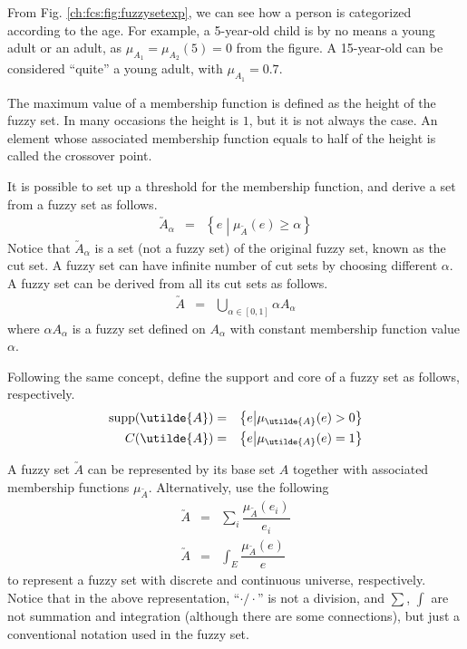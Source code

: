 From Fig. \ref{ch:fcs:fig:fuzzysetexp}, we can see how a person is categorized according to the age. For example, a 5-year-old child is by no means a young adult or an adult, as $\mu_{A_1}=\mu_{A_2}(5)=0$ from the figure. A 15-year-old can be considered ``quite'' a young adult, with $\mu_{A_1}=0.7$.

The maximum value of a membership function is defined as the height of the fuzzy set. In many occasions the height is $1$, but it is not always the case. An element whose associated membership function equals to half of the height is called the crossover point.

It is possible to set up a threshold for the membership function, and derive a set from a fuzzy set as follows.
\begin{eqnarray}
	\utilde{A}_\alpha &=& \left\{e \middle| \mu_{\utilde{A}} (e) \geq \alpha \right\} \nonumber
\end{eqnarray}
Notice that $\utilde{A}_\alpha$ is a set (not a fuzzy set) of the original fuzzy set, known as the cut set. A fuzzy set can have infinite number of cut sets by choosing different $\alpha$. A fuzzy set can be derived from all its cut sets as follows.
\begin{eqnarray}
	\utilde{A} &=& \bigcup_{\alpha \in [0, 1]} \alpha A_\alpha \nonumber
\end{eqnarray}
where $\alpha A_\alpha$ is a fuzzy set defined on $ A_\alpha$ with constant membership function value $\alpha$.

Following the same concept, define the support and core of a fuzzy set as follows, respectively.
\begin{eqnarray}
	\textup{supp}(\utilde{A}) &=& \left\{ e \middle| \mu_{\utilde{A}}(e) > 0 \right\} \nonumber \\
	C(\utilde{A}) &=& \left\{ e \middle| \mu_{\utilde{A}}(e) = 1 \right\} \nonumber
\end{eqnarray}

A fuzzy set $\utilde{A}$ can be represented by its base set $A$ together with associated membership functions $\mu_{\utilde{A}}$. Alternatively, use the following
\begin{eqnarray}
	\utilde{A} &=& \sum_{i} \dfrac{\mu_{\utilde{A}}(e_i)}{e_i} \nonumber \\
	\utilde{A} &=& \int_{E} \dfrac{\mu_{\utilde{A}}(e)}{e} \nonumber
\end{eqnarray}
to represent a fuzzy set with discrete and continuous universe, respectively. Notice that in the above representation, ``$\cdot / \cdot$'' is not a division, and $\sum$, $\int$ are not summation and integration (although there are some connections), but just a conventional notation used in the fuzzy set.

